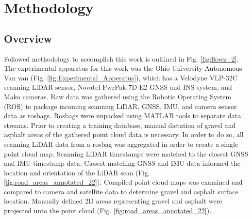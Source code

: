 \documentclass[balance,upint,subscriptcorrection,varvw,mathalfa=cal=boondoxo,colorlinks]{asmeconf}
\begin{document}
	
	
	
	
	
\section{Methodology}

	\subsection{Overview}

	{Followed methodology to accomplish this work is outlined in Fig. \ref{fig:flowz_2}. The experimental apparatus for this work was the Ohio University Autonomous Van van (Fig. \ref{fig:Experimental_Apperatus}), which has a Velodyne VLP-32C scanning LiDAR sensor, Novatel PwrPak 7D-E2 GNSS and INS system, and Mako cameras. Raw data was gathered using the Robotic Operating System (ROS) to package incoming scanning LiDAR, GNSS, IMU, and camera sensor data as rosbags. Rosbags were unpacked using MATLAB tools to separate data streams. Prior to creating a training database, manual dictation of gravel and asphalt areas of the gathered point cloud data is necessary. In order to do so, all scanning LiDAR data from a rosbag was aggregated in order to create a single point cloud map. Scanning LiDAR timestamps were matched to the closest GNSS and IMU timestamp data. Closest matching GNSS and IMU data informed the location and orientation of the LiDAR scan (Fig. \ref{fig:road_areas_annotated_22}). Compiled point cloud maps was examined and compared to camera and satellite data to determine gravel and asphalt surface location. Manually defined 2D areas representing gravel and asphalt were projected unto the point cloud (Fig. \ref{fig:road_areas_annotated_22}).}
	
\end{document}
